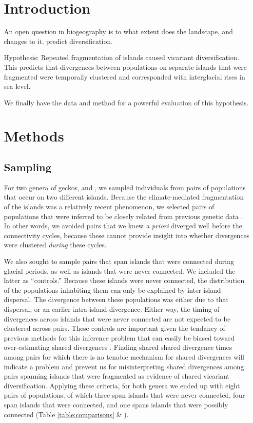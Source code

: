 \section{Introduction}

An open question in biogeography is to what extent does the landscape, and
changes to it, predict diversification.

Hypothesis: Repeated fragmentation of islands caused vicariant diversification.
This predicts that divergences between populations on separate islands that
were fragmented were temporally clustered and corresponded with interglacial
rises in sea level.

We finally have the data and method for a powerful evaluation of this
hypothesis.


\section{Methods}

\subsection{Sampling}
For two genera of geckos,  and , we sampled
individuals from pairs of populations that occur on two different islands.
Because the climate-mediated fragmentation of the islands was a relatively
recent phenomenon, we selected pairs of populations that were inferred to be
closely related from previous genetic data
\citep{Siler2012, Siler2014kikuchii, Welton2010, Welton2010zootaxa, Siler2010}.
In other words, we avoided pairs that we knew \emph{a priori} diverged well
before the connectivity cycles, because these cannot provide insight into
whether divergences were clustered \emph{during} these cycles.

We also sought to sample pairs that span islands that were connected during
glacial periods, as well as islands that were never connected.
We included the latter as ``controls.''
Because these islands were never connected, the distribution of the populations
inhabiting them can only be explained by inter-island dispersal.
The divergence between these populations was either due to that
dispersal, or an earlier intra-island divergence.
Either way, the timing of divergences across islands that were never connected
are not expected to be clustered across pairs.
These controls are important given the tendancy of previous methods for this
inference problem that can easily be biased toward over-estimating shared
divergences \citep{Oaks2012,Oaks2014reply}.
Finding shared shared divergence times among pairs for which there is no
tenable mechanism for shared divergences will indicate a problem and prevent us
for misinterpreting shared divergences among pairs spanning islands that were
fragmented as evidence of shared vicariant diversification.
Applying these criteria, for both genera we ended up with eight pairs of
populations, of which three span islands that were never connected, four span
islands that were connected, and one spans islands that were possibly connected
(Table \ref{table:comparisons} \& ).

